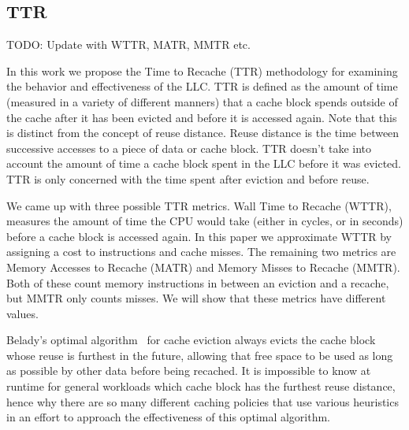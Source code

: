%

\subsection{TTR}
\label{sec:metrics}
TODO: Update with WTTR, MATR, MMTR etc.

In this work we propose the Time to Recache (TTR) methodology for
examining the behavior and effectiveness of the LLC.  TTR is defined
as the amount of time (measured in a variety of different manners) that a cache
block spends outside of the cache after it has been evicted and
before it is accessed again.  Note that this is distinct from the
concept of reuse distance.  Reuse distance is the time between
successive accesses to a piece of data or cache block.  TTR doesn't
take into account the amount of time a cache block spent in the LLC
before it was evicted.  TTR is only concerned with the time spent
after eviction and before reuse.

We came up with three possible TTR metrics. Wall Time to Recache (WTTR), measures
the amount of time the CPU would take (either in cycles, or in seconds) before a cache block is accessed again.
In this paper we approximate WTTR by assigning a cost to instructions and cache misses.
The remaining two metrics are Memory Accesses to Recache (MATR) and Memory Misses to Recache (MMTR).
Both of these count memory instructions in between an eviction and a recache, but MMTR only counts misses.
We will show that these metrics have different values.

Belady's optimal algorithm~\cite{belady66} for cache eviction always
evicts
the cache block whose reuse is furthest in the future, allowing that
free space to be used as long as possible by other data before being
recached.  It is impossible to know at runtime for general workloads
which cache block has the furthest reuse distance, hence why there are
so many different caching policies that use various heuristics in an
effort to approach the effectiveness of this optimal algorithm.

